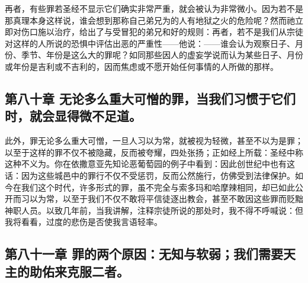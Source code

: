 再者，有些罪若圣经不显示它们确实非常严重，就会被认为非常微小。因为若不是那真理本身这样说，谁会想到那称自己弟兄为的人有地狱之火的危险呢？然而祂立即对伤口施以治疗，给出了与受冒犯的弟兄和好的规则：再者，若不是我们从宗徒对这样的人所说的恐惧中评估出恶的严重性——他说：——谁会认为观察日子、月份、季节、年份是这么大的罪呢？如同那些因人的虚妄学说而认为某些日子、月份或年份是吉利或不吉利的，因而焦虑或不愿开始任何事情的人所做的那样。\par


\subsection{第八十章 无论多么重大可憎的罪，当我们习惯于它们时，就会显得微不足道。}

此外，罪无论多么重大可憎，一旦人习以为常，就被视为轻微，甚至不以为是罪；以至于这样的罪不仅不被隐藏，反而被夸耀，四处张扬；正如经上所载：圣经中称这种不义为。你在依撒意亚先知论恶葡萄园的例子中看到：因此创世纪中也有这话：因为这些城邑中的罪行不仅不受惩罚，反而公然施行，仿佛受到法律保护。如今在我们这个时代，许多形式的罪，虽不完全与索多玛和哈摩辣相同，却已如此公开而习以为常，以至于我们不仅不敢将平信徒逐出教会，甚至不敢因这些罪而贬黜神职人员。以致几年前，当我讲解，注释宗徒所说的那处时，我不得不呼喊说：但我将看看，过度的悲伤是否使我言语轻率。\par


\subsection{第八十一章 罪的两个原因：无知与软弱；我们需要天主的助佑来克服二者。}

